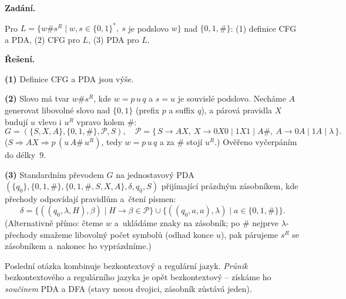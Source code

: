 \documentclass[11pt,a4paper]{article}
\begin{document}
\begin{priklad}
\par
\textbf{Zadání.}\par
Pro $L=\{w\#s^R\mid w,s\in\{0,1\}^*,\ s$ je podslovo $w\}$ nad $\{0,1,\#\}$: (1) definice CFG a PDA, (2) CFG pro $L$, (3) PDA pro $L$.

\smallskip
\textbf{Řešení.}\par
\textbf{(1)} Definice CFG a PDA jsou výše.

\textbf{(2)} Slovo má tvar $w\#s^R$, kde $w=p\,u\,q$ a $s=u$ je souvislé podslovo. Necháme $A$ generovat libovolné slovo nad $\{0,1\}$ (prefix $p$ a suffix $q$), a párová pravidla $X$ budují $u$ vlevo i $u^R$ vpravo kolem $\#$:
\[ G=(\{S,X,A\},\{0,1,\#\},\mathcal P,S),\quad \mathcal P=\{\,S\to AX,\ X\to 0X0\mid 1X1\mid A\#,\ A\to 0A\mid 1A\mid\lambda\,\}. \]
($S\Rightarrow AX\Rightarrow p\,(u\,A\#\,u^R)$, tedy $w=p\,u\,q$ a za $\#$ stojí $u^R$.) Ověřeno vyčerpáním do délky~$9$.

\textbf{(3)} Standardním převodem $G$ na jednostavový PDA $(\{q_0\},\{0,1,\#\},\{0,1,\#,S,X,A\},\delta,q_0,S)$ přijímající prázdným zásobníkem, kde přechody odpovídají pravidlům a~čtení písmen:
\[ \delta=\{((q_0,\lambda,H),\beta)\mid H\to\beta\in\mathcal P\}\cup\{((q_0,a,a),\lambda)\mid a\in\{0,1,\#\}\}. \]
(Alternativně přímo: čteme $w$ a~ukládáme znaky na zásobník; po $\#$ nejprve $\lambda$-přechody smažeme libovolný počet symbolů (odhad konce $u$), pak párujeme $s^R$ se zásobníkem a~nakonec ho vyprázdníme.)
\end{priklad}

Poslední otázka kombinuje bezkontextový a regulární jazyk. \emph{Průnik} bezkontextového a regulárního jazyka je opět bezkontextový -- získáme ho \emph{součinem} PDA a DFA (stavy nesou dvojici, zásobník zůstává jeden).
\end{document}
